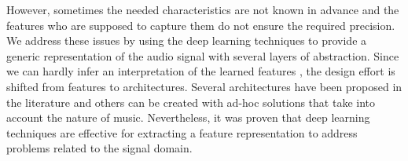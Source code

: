However, sometimes the needed characteristics are not known in advance and the features who are supposed to capture them do not ensure the required precision. We address these issues by using the deep learning techniques to provide a generic representation of the audio signal with several layers of abstraction. Since we can hardly infer an interpretation of the learned features \cite{choi2015auralisation}, the design effort is shifted from features to architectures. Several architectures have been proposed in the literature and others can be created with ad-hoc solutions that take into account the nature of music. Nevertheless, it was proven that deep learning techniques are effective for extracting a feature representation to address problems related to the signal domain. 
